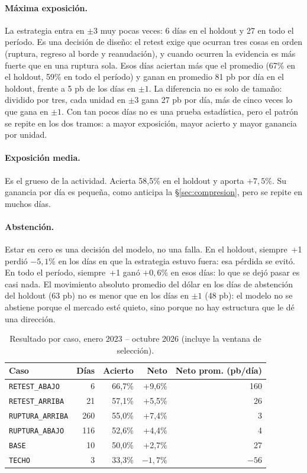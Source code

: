 \documentclass[10pt,a4paper]{article}
\begin{document}
\paragraph{Máxima exposición.} La estrategia entra en $\pm3$ muy pocas veces: 6
días en el holdout y 27 en todo el período. Es una decisión de diseño: el retest
exige que ocurran tres cosas en orden (ruptura, regreso al borde y reanudación), y
cuando ocurren la evidencia es más fuerte que en una ruptura sola. Esos días
aciertan más que el promedio (67\% en el holdout, 59\% en todo el período) y ganan
en promedio 81 pb por día en el holdout, frente a 5 pb de los días en $\pm1$. La
diferencia no es solo de tamaño: dividido por tres, cada unidad en $\pm3$ gana 27
pb por día, más de cinco veces lo que gana en $\pm1$. Con tan pocos días no es una
prueba estadística, pero el patrón se repite en los dos tramos: a mayor exposición,
mayor acierto y mayor ganancia por unidad.

\paragraph{Exposición media.} Es el grueso de la actividad. Acierta 58,5\% en el
holdout y aporta $+7{,}5\%$. Su ganancia por día es pequeña, como anticipa la
§\ref{sec:compresion}, pero se repite en muchos días.

\paragraph{Abstención.} Estar en cero es una decisión del modelo, no una falla. En
el holdout, siempre~+1 perdió $-5{,}1\%$ en los días en que la estrategia estuvo
fuera: esa pérdida se evitó. En todo el período, siempre~+1 ganó $+0{,}6\%$ en esos
días: lo que se dejó pasar es casi nada. El movimiento absoluto promedio del dólar
en los días de abstención del holdout (63 pb) no es menor que en los días en
$\pm1$ (48 pb): el modelo no se abstiene porque el mercado esté quieto, sino
porque no hay estructura que le dé una dirección.

\begin{table}[htbp]\centering\small
\begin{tabular}{@{}lrrrr@{}}
\toprule
Caso & Días & Acierto & Neto & Neto prom. (pb/día) \\
\midrule
\texttt{RETEST\_ABAJO}   & 6   & 66{,}7\% & +9{,}6\%  & 160 \\
\texttt{RETEST\_ARRIBA}  & 21  & 57{,}1\% & +5{,}5\%  & 26 \\
\texttt{RUPTURA\_ARRIBA} & 260 & 55{,}0\% & +7{,}4\%  & 3 \\
\texttt{RUPTURA\_ABAJO}  & 116 & 52{,}6\% & +4{,}4\%  & 4 \\
\texttt{BASE}            & 10  & 50{,}0\% & +2{,}7\%  & 27 \\
\texttt{TECHO}           & 3   & 33{,}3\% & $-1{,}7\%$ & $-56$ \\
\bottomrule
\end{tabular}
\caption{Resultado por caso, enero 2023 -- octubre 2026 (incluye la ventana de
selección).}\label{tab:casos}
\end{table}
\end{document}
